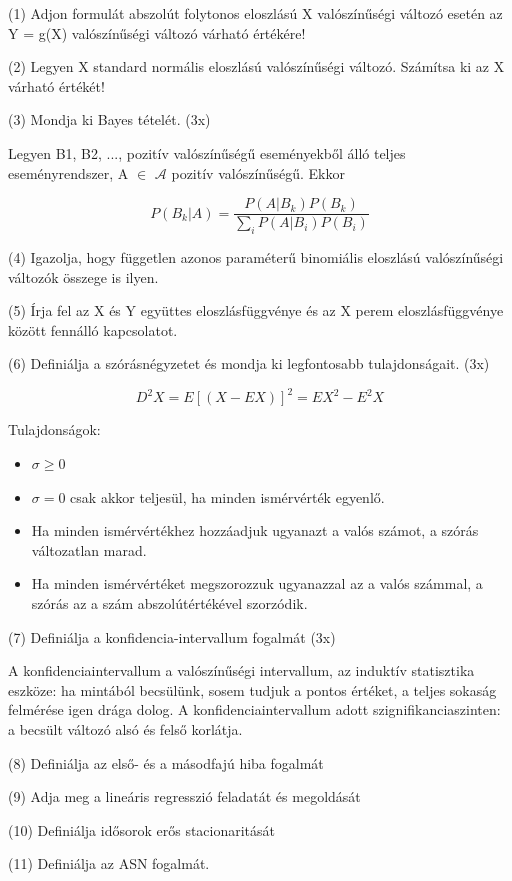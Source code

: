 \documentclass[12p]{article}
\begin{document}
(1) Adjon formulát abszolút folytonos eloszlású X valószínűségi változó esetén az Y = g(X) valószínűségi változó várható értékére!

(2) Legyen X standard normális eloszlású valószínűségi változó. Számítsa ki az X várható értékét! 

(3) Mondja ki Bayes tételét. (3x)

Legyen B1, B2, ..., pozitív valószínűségű eseményekből álló teljes eseményrendszer, A $\in$ $\mathscr{A}$ pozitív valószínűségű. Ekkor

$$\displaystyle{P(B_k|A) = \frac{P(A|B_k)P(B_k)}{\displaystyle{\sum_i} P(A|B_i)P(B_i)}}$$

(4) Igazolja, hogy független azonos paraméterű binomiális eloszlású valószínűségi változók összege is ilyen.

(5) Írja fel az X és Y együttes eloszlásfüggvénye és az X perem eloszlásfüggvénye között fennálló kapcsolatot.

(6)  Definiálja a szórásnégyzetet és mondja ki legfontosabb tulajdonságait. (3x)

$$D^2X = E[(X - EX)]^2 = EX^2 - E^2X$$

Tulajdonságok:

\begin{itemize}
	\item $\sigma \geq 0$
	\item $\sigma = 0$ csak akkor teljesül, ha minden ismérvérték egyenlő.
	\item Ha minden ismérvértékhez hozzáadjuk ugyanazt a valós számot, a szórás változatlan marad.
	\item Ha minden ismérvértéket megszorozzuk ugyanazzal az a valós számmal, a szórás az a szám abszolútértékével szorzódik.
\end{itemize}

(7) Definiálja a konfidencia-intervallum fogalmát (3x)

A konfidenciaintervallum a valószínűségi intervallum, az induktív statisztika eszköze: ha mintából becsülünk, sosem tudjuk a pontos értéket, a teljes sokaság felmérése igen drága dolog. A konfidenciaintervallum adott szignifikanciaszinten: a becsült változó alsó és felső korlátja.

(8) Definiálja az első- és a másodfajú hiba fogalmát

(9) Adja meg a lineáris regresszió feladatát és megoldását

(10) Definiálja idősorok erős stacionaritását

(11) Definiálja az ASN fogalmát.
\end{document}
